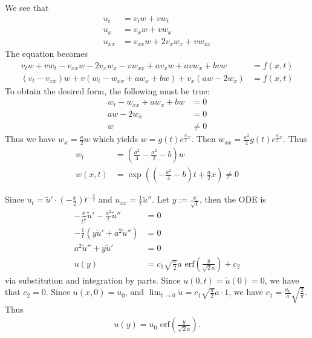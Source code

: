 \documentclass[12pt]{article}
\begin{document}
\begin{problem}[1.4.11]
We see that
\begin{align*}
	u_t &= v_t w + vw_t \\
	u_x &= v_x w + vw_x \\
	u_{x x} &= v_{ xx} w + 2v_xw_x + vw_{x x}
\end{align*}
The equation becomes
\begin{align*}
	v_t w+vw_t - v_{x x}w-2v_xw_x - vw_{x x} + a v_xw + avw_x + bvw &= f(x,t) \\
	(v_t- v_{x x})w + v(w_t-w_{x x}+aw_x+bw) + v_x(aw-2w_x) &= f(x,t) 
\end{align*}
To obtain the desired form, the following must be true:
\begin{align*}
	w_t -w_{x x}+ aw_x + bw &= 0 \\
	aw-2w_x &= 0 \\
	w &\neq 0 
\end{align*}
Thus we have $ w_x = \frac{a}{2}w$ which yields $ w=g(t) e^{\frac{a}{2}x}$. Then $ w_{x x} = \frac{a^2}{ 4} g(t) e^{\frac{a}{2}x}$. Thus
\begin{align*}
	w_t &= \left(\frac{a^2}{ 4}- \frac{a^2}{ 2} - b \right) w  \\
	w(x,t) &= \exp \left( \left(-\frac{a^2}{ 4}-b \right)t+ \frac{a}{2}x  \right)  \neq 0
\end{align*}
\end{problem}

\begin{problem}[1.4.12]
Since $ u_t = \widetilde{ u}' \cdot \left( - \frac{x}{2} \right) t^{-\frac{3}{2}} $ and $ u_{x x} = \frac{1}{t} \widetilde{ u}''$. Let $ y:= \frac{x}{\sqrt{t} }$, then the ODE is
\begin{align*}
	-\frac{x}{t^{\frac{3}{2}}} \widetilde{ u}' - \frac{a^2}{ t}\widetilde{ u}'' &= 0 \\
	-\frac{1}{t} (y \widetilde{ u}' + a^2 \widetilde{ u}'') &= 0 \\
	a^2 \widetilde{ u}'' + y \widetilde{ u}' &= 0 \\
	u(y) &= c_1 \sqrt{ \frac{\pi}{2 }} a \text{ erf}\left( \frac{y}{ \sqrt{2} a} \right) +c_2    
\end{align*}
via substitution and integration by parts. Since $ u(0,t) = \widetilde{ u}(0) = 0$, we have that $ c_2 = 0$. Since $ u(x,0)=u_0$, and $ \lim_{ t \to 0} \widetilde{ u} = c_1 \sqrt{\frac{\pi}{ 2}}a \cdot 1 $, we have  $ c_1 = \frac{u_0}{ a} \sqrt{\frac{2}{\pi}} $. Thus
\begin{align*}
	u(y) = u_0 \text{ erf}\left( \frac{y}{\sqrt{2} a} \right).  
\end{align*}
\end{problem}
\end{document}
